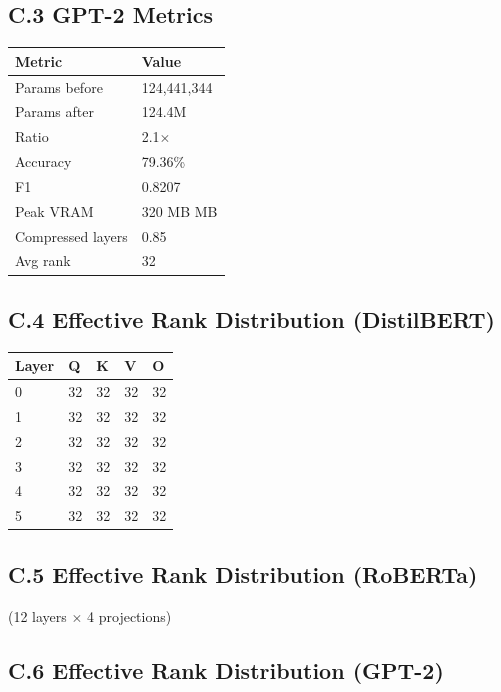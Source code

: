 \subsection{C.3 GPT-2 Metrics}

\begin{table}[H]
\centering
\small
\begin{tabular}{ll}
\toprule
\textbf{Metric} & \textbf{Value} \\
\midrule
Params before & 124,441,344 \\
Params after & 124.4M \\
Ratio & 2.1$\times$ \\
Accuracy & 79.36\% \\
F1 & 0.8207 \\
Peak VRAM & 320 MB MB \\
Compressed layers & 0.85 \\
Avg rank & 32 \\
\bottomrule
\end{tabular}
\end{table}

\subsection{C.4 Effective Rank Distribution (DistilBERT)}

\begin{table}[H]
\centering
\small
\begin{tabular}{lllll}
\toprule
\textbf{Layer} & \textbf{Q} & \textbf{K} & \textbf{V} & \textbf{O} \\
\midrule
0 & 32 & 32 & 32 & 32 \\
1 & 32 & 32 & 32 & 32 \\
2 & 32 & 32 & 32 & 32 \\
3 & 32 & 32 & 32 & 32 \\
4 & 32 & 32 & 32 & 32 \\
5 & 32 & 32 & 32 & 32 \\
\bottomrule
\end{tabular}
\end{table}

\subsection{C.5 Effective Rank Distribution (RoBERTa)}

(12 layers $\times$ 4 projections)

\subsection{C.6 Effective Rank Distribution (GPT-2)}

